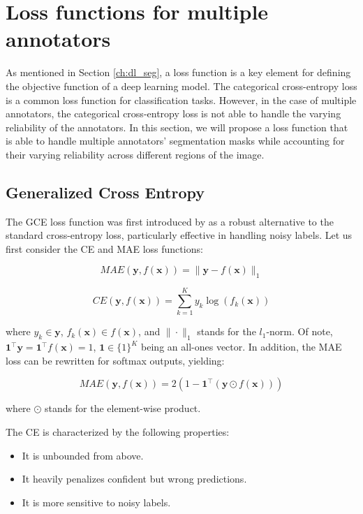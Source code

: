 \section{Loss functions for multiple annotators}

As mentioned in Section \ref{ch:dl_seg}, a loss function is a key element
for defining the objective function of a deep learning model. The
categorical cross-entropy loss is a common loss function for
classification tasks. However, in the case of multiple annotators,
the categorical cross-entropy loss is not able to handle the varying
reliability of the annotators. In this section, we will propose a
loss function that is able to handle multiple annotators'
segmentation masks while accounting for their varying reliability
across different regions of the image.
\subsection{Generalized Cross Entropy}

The \gls{GCE} loss function was first introduced by
\cite{ZhangEtAl2018} as a robust alternative to the standard
cross-entropy loss, particularly effective in handling noisy labels.
Let us first consider the \gls{CE} and \gls{MAE} loss functions:

\begin{equation}
  MAE(\mathbf{y}, f(\mathbf{x})) = \|\mathbf{y} - f(\mathbf{x})\|_1
\end{equation}

\begin{equation}
  CE(\mathbf{y}, f(\mathbf{x})) = \sum_{k=1}^K y_k \log(f_k(\mathbf{x}))
\end{equation}

where $y_k \in \mathbf{y}$, $f_k(\mathbf{x}) \in f(\mathbf{x})$, and
$\|\cdot\|_1$ stands for the $l_1$-norm. Of note,
$\mathbf{1}^\top\mathbf{y} = \mathbf{1}^\top f(\mathbf{x}) = 1$,
$\mathbf{1} \in \{1\}^K$ being an all-ones vector. In addition, the
MAE loss can be rewritten for softmax outputs, yielding:

\begin{equation}
  MAE(\mathbf{y}, f(\mathbf{x})) = 2(1 - \mathbf{1}^\top(\mathbf{y}
  \odot f(\mathbf{x})))
\end{equation}

where $\odot$ stands for the element-wise product.

The \gls{CE} is characterized by the following properties:

\begin{itemize}
  \item It is unbounded from above.
  \item It heavily penalizes confident but wrong predictions.
  \item It is more sensitive to noisy labels.
\end{itemize}

